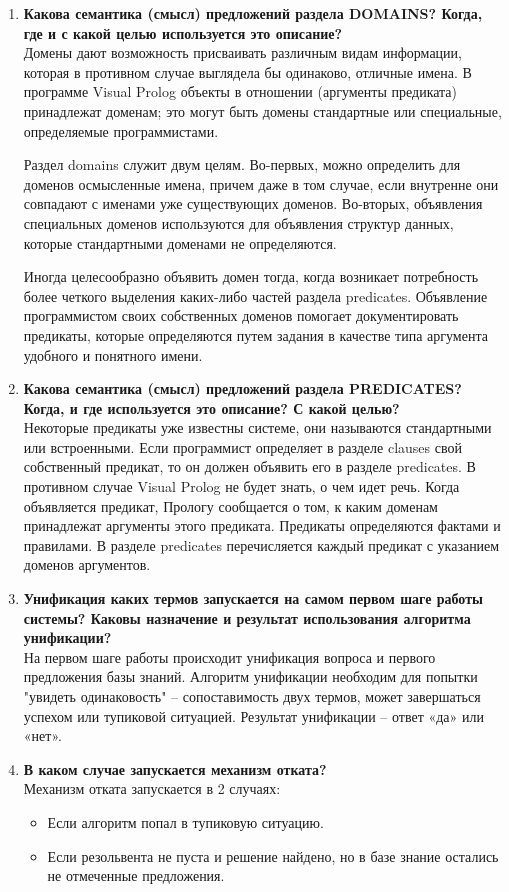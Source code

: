 \begin{enumerate}
    \item \textbf{Какова семантика (смысл) предложений раздела DOMAINS?  Когда, где и с какой целью используется это описание?}\\
   	Домены дают возможность присваивать различным видам информации, которая в противном случае выглядела бы одинаково, отличные имена. В программе Visual Prolog объекты в отношении (аргументы предиката) принадлежат доменам; это могут быть домены стандартные или специальные, определяемые программистами.
   	
   	Раздел domains служит двум целям. Во-первых, можно определить для доменов осмысленные имена, причем даже в том случае, если внутренне они совпадают с именами уже существующих доменов. Во-вторых, объявления специальных доменов используются для объявления структур данных, которые стандартными доменами не определяются.
   	
   	Иногда целесообразно объявить домен тогда, когда возникает потребность более четкого выделения каких-либо частей раздела predicates. Объявление программистом своих собственных доменов помогает документировать предикаты, которые определяются путем задания в качестве типа аргумента удобного и понятного имени.
   	
    
    \item \textbf{Какова семантика (смысл) предложений раздела PREDICATES? Когда, и где используется это описание? С какой целью?}\\
    Некоторые предикаты уже известны системе, они называются стандартными или встроенными. Если программист определяет в разделе clauses свой собственный предикат, то он должен объявить его в разделе predicates. В противном случае Visual Prolog не будет знать, о чем идет речь. Когда объявляется предикат, Прологу сообщается о том, к каким доменам принадлежат аргументы этого предиката.
    Предикаты определяются фактами и правилами. В разделе predicates  перечисляется каждый предикат с указанием доменов аргументов.
    

    \item \textbf{Унификация каких термов запускается на самом первом шаге работы системы? Каковы назначение и результат использования алгоритма унификации?}\\
    На первом шаге работы происходит унификация вопроса и первого предложения базы знаний. Алгоритм унификации необходим для попытки "увидеть одинаковость" – сопоставимость двух термов, может завершаться успехом или тупиковой ситуацией. Результат унификации – ответ «да» или «нет». 
    
    \item \textbf{В каком случае запускается механизм отката?}\\
    Механизм отката запускается в 2 случаях:
    \begin{itemize}
    	\item Если алгоритм попал в тупиковую ситуацию. 
    	\item Если резольвента не пуста и решение найдено, но в базе знание остались не отмеченные предложения.
    \end{itemize}  
\end{enumerate}

